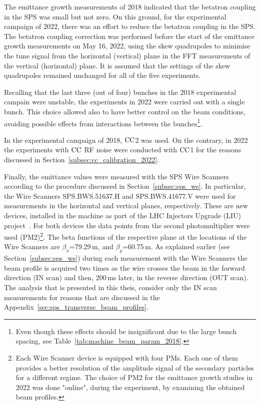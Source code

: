 The emittance growth measurements of 2018 indicated that the betatron coupling in the SPS was small but not zero. On this ground, for the experimental campaign of 2022, there was an effort to reduce the betatron coupling in the SPS. The betatron coupling correction was performed before the start of the emittance growth measurements on May 16, 2022, using the skew quadrupoles to minimise the tune signal from the horizontal (vertical) plane in the FFT measurements of the vertical (horizontal) plane. It is assumed that the settings of the skew quadrupoles remained unchanged for all of the five experiments.

Recalling that the last three (out of four) bunches in the 2018 experimental campain were unstable, the experiments in 2022 were carried out with a single bunch. This choice allowed also to have better control on the beam conditions, avoiding possible effects from interactions between the bunches\footnote{Even though these effects should be insignificant due to the large bunch spacing, see Table~\ref{tab:machine_beam_param_2018}.}.

In the experimental campaign of 2018, ${\mathrm{CC}}$2 was used. On the contrary, in 2022 the experiments with  ${\mathrm{CC}}$ RF noise were conducted with ${\mathrm{CC}}$1 for the reasons discussed in Section~\ref{subsec:cc_calibration_2022}.

Finally, the emittance values were measured with the SPS Wire Scanners according to the procedure discussed in Section~\ref{subsec:sps_ws}. In particular, the Wire Scanners SPS.BWS.51637.H and SPS.BWS.41677.V were used for measurements in the horizontal and vertical planes, respectively. These are new devices, installed in the machine as part of the LHC Injectors Upgrade (LIU) project~\cite{Shaposhnikova:2016cix}. For both devices the data points from the second photomultiplier were used (PM2)\footnote{Each Wire Scanner device is equipped with four PMs. Each one of them provides a better resolution of the amplitude signal of the secondary particles for a different regime. The choice of PM2 for the emittance growth studies in 2022 was done "online", during the experiment, by examining the obtained beam profiles.}. The beta functions of the respective plane at the locations of the Wire Scanners are $\beta_x$=79.29\,m, and $\beta_y$=60.75\,m. 
As explained earlier (see Section~\ref{subsec:sps_ws}) during each measurement with the Wire Scanners the beam profile is acquired two times as the wire crosses the beam in the forward direction (IN scan) and then, 200\,ms later, in the reverse direction (OUT scan). The analysis that is presented in this theis, consider only the IN scan measurements for reasons that are discussed in the Appendix~\ref{sec:sps_transverse_beam_profiles}. 



